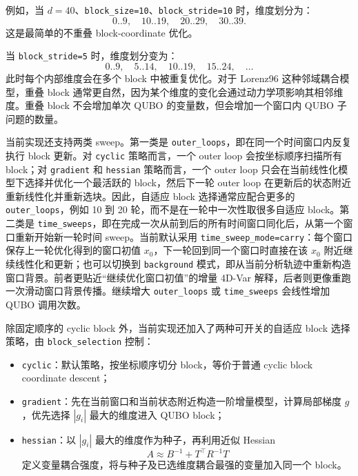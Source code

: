 \documentclass[UTF8,a4paper,12pt]{ctexart}
\begin{document}
例如，当 $d=40$、\texttt{block\_size=10}、\texttt{block\_stride=10} 时，维度划分为：
\begin{equation}
  0..9,\quad 10..19,\quad 20..29,\quad 30..39.
\end{equation}
这是最简单的不重叠 block-coordinate 优化。

当 \texttt{block\_stride=5} 时，维度划分变为：
\begin{equation}
  0..9,\quad 5..14,\quad 10..19,\quad 15..24,\quad \ldots
\end{equation}
此时每个内部维度会在多个 block 中被重复优化。对于 Lorenz96 这种邻域耦合模型，重叠 block 通常更自然，因为某个维度的变化会通过动力学项影响其相邻维度。重叠 block 不会增加单次 QUBO 的变量数，但会增加一个窗口内 QUBO 子问题的数量。

当前实现还支持两类 sweep。第一类是 \texttt{outer\_loops}，即在同一个时间窗口内反复执行 block 更新。对 \texttt{cyclic} 策略而言，一个 outer loop 会按坐标顺序扫描所有 block；对 \texttt{gradient} 和 \texttt{hessian} 策略而言，一个 outer loop 只会在当前线性化模型下选择并优化一个最活跃的 block，然后下一轮 outer loop 在更新后的状态附近重新线性化并重新选块。因此，自适应 block 选择通常应配合更多的 \texttt{outer\_loops}，例如 10 到 20 轮，而不是在一轮中一次性取很多自适应 block。第二类是 \texttt{time\_sweeps}，即在完成一次从前到后的所有时间窗口同化后，从第一个窗口重新开始新一轮时间 sweep。当前默认采用 \texttt{time\_sweep\_mode=carry}：每个窗口保存上一轮优化得到的窗口初值 $x_0$，下一轮回到同一个窗口时直接在该 $x_0$ 附近继续线性化和更新；也可以切换到 \texttt{background} 模式，即从当前分析轨迹中重新构造窗口背景。前者更贴近“继续优化窗口初值”的增量 4D-Var 解释，后者则更像重跑一次滑动窗口背景传播。继续增大 \texttt{outer\_loops} 或 \texttt{time\_sweeps} 会线性增加 QUBO 调用次数。

除固定顺序的 cyclic block 外，当前实现还加入了两种可开关的自适应 block 选择策略，由 \texttt{block\_selection} 控制：
\begin{itemize}
  \item \texttt{cyclic}：默认策略，按坐标顺序切分 block，等价于普通 cyclic block coordinate descent；
  \item \texttt{gradient}：先在当前窗口和当前状态附近构造一阶增量模型，计算局部梯度 $g$，优先选择 $|g_i|$ 最大的维度进入 QUBO block；
  \item \texttt{hessian}：以 $|g_i|$ 最大的维度作为种子，再利用近似 Hessian
  \begin{equation}
    A \approx B^{-1} + T^{\top} R^{-1} T
  \end{equation}
  定义变量耦合强度，将与种子及已选维度耦合最强的变量加入同一个 block。
\end{itemize}
\end{document}
